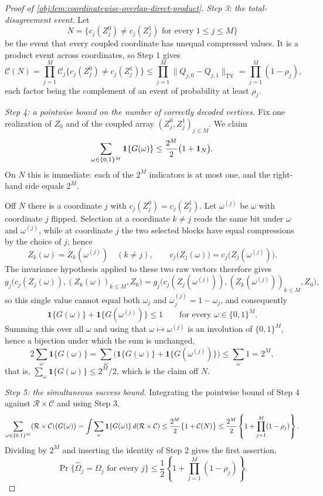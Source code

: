 \documentclass[11pt]{article}
\begin{document}
\begin{proof}[Proof of \cref{obj:lem:coordinatewise-overlap-direct-product}]
\emph{Step 3: the total-disagreement event.}
Let
\[
N=\bigl\{c_j(Z_j^0)\neq c_j(Z_j^1)\text{ for every }1\leq j\leq M\bigr\}
\]
be the event that every coupled coordinate has unequal compressed values. It is a product event across coordinates, so Step 1 gives
\[
\mathcal C(N)
=\prod_{j=1}^M\mathcal C_j\bigl\{c_j(Z_j^0)\neq c_j(Z_j^1)\bigr\}
\leq\prod_{j=1}^M\lVert Q_{j,0}-Q_{j,1}\rVert_{\mathrm{TV}}
=\prod_{j=1}^M(1-\rho_j),
\]
each factor being the complement of an event of probability at least \(\rho_j\).

\emph{Step 4: a pointwise bound on the number of correctly decoded vertices.}
Fix one realization of \(Z_0\) and of the coupled array \((Z_j^0,Z_j^1)_{j\leq M}\). We claim
\[
\sum_{\omega\in\{0,1\}^M}\mathbf 1\{G(\omega)\}
\leq
{2^M\over2}\bigl(1+\mathbf 1_N\bigr).
\]
On \(N\) this is immediate: each of the \(2^M\) indicators is at most one, and the right-hand side equals \(2^M\).

Off \(N\) there is a coordinate \(j\) with \(c_j(Z_j^0)=c_j(Z_j^1)\). Let \(\omega^{(j)}\) be \(\omega\) with coordinate \(j\) flipped. Selection at a coordinate \(k\neq j\) reads the same bit under \(\omega\) and \(\omega^{(j)}\), while at coordinate \(j\) the two selected blocks have equal compressions by the choice of \(j\); hence
\[
Z_k(\omega)=Z_k(\omega^{(j)})\quad(k\neq j),
\qquad
c_j\bigl(Z_j(\omega)\bigr)=c_j\bigl(Z_j(\omega^{(j)})\bigr).
\]
The invariance hypothesis applied to these two raw vectors therefore gives
\[
g_j\bigl(c_j(Z_j(\omega)),(Z_k(\omega))_{k\leq M},Z_0\bigr)
=
g_j\bigl(c_j(Z_j(\omega^{(j)})),(Z_k(\omega^{(j)}))_{k\leq M},Z_0\bigr),
\]
so this single value cannot equal both \(\omega_j\) and \(\omega^{(j)}_j=1-\omega_j\), and consequently
\[
\mathbf 1\{G(\omega)\}+\mathbf 1\{G(\omega^{(j)})\}\leq1
\qquad\text{for every }\omega\in\{0,1\}^M .
\]
Summing this over all \(\omega\) and using that \(\omega\mapsto\omega^{(j)}\) is an involution of \(\{0,1\}^M\), hence a bijection under which the sum is unchanged,
\[
2\sum_{\omega}\mathbf 1\{G(\omega)\}
=
\sum_{\omega}\bigl(\mathbf 1\{G(\omega)\}+\mathbf 1\{G(\omega^{(j)})\}\bigr)
\leq
\sum_{\omega}1
=2^M,
\]
that is, \(\sum_\omega\mathbf 1\{G(\omega)\}\leq2^M/2\), which is the claim off \(N\).

\emph{Step 5: the simultaneous success bound.}
Integrating the pointwise bound of Step 4 against \(\mathcal R\times\mathcal C\) and using Step 3,
\[
\sum_{\omega\in\{0,1\}^M}(\mathcal R\times\mathcal C)\bigl(G(\omega)\bigr)
=
\int\sum_{\omega}\mathbf 1\{G(\omega)\}\,d(\mathcal R\times\mathcal C)
\leq
{2^M\over2}\bigl\{1+\mathcal C(N)\bigr\}
\leq
{2^M\over2}\left\{1+\prod_{j=1}^M(1-\rho_j)\right\}.
\]
Dividing by \(2^M\) and inserting the identity of Step 2 gives the first assertion,
\[
\Pr\{\widehat\Omega_j=\Omega_j\text{ for every }j\}
\leq
\frac12\left\{1+\prod_{j=1}^M(1-\rho_j)\right\}.
\]


\end{proof}
\end{document}
